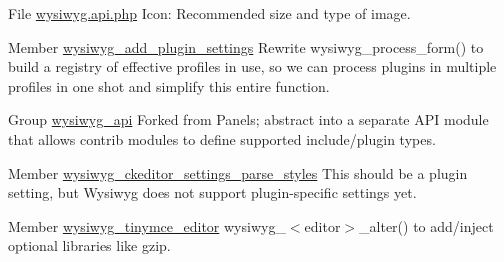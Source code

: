 \label{todo__todo000091}
\hypertarget{todo__todo000091}{}
 
\begin{DoxyDescription}
\item[File \hyperlink{wysiwyg_8api_8php}{wysiwyg.api.php} ]Icon: Recommended size and type of image.


\end{DoxyDescription}

\label{todo__todo000093}
\hypertarget{todo__todo000093}{}
 
\begin{DoxyDescription}
\item[Member \hyperlink{wysiwyg_8module_ab2d3844da95500eafb246c12e44593c3}{wysiwyg\_\-add\_\-plugin\_\-settings} ]Rewrite wysiwyg\_\-process\_\-form() to build a registry of effective profiles in use, so we can process plugins in multiple profiles in one shot and simplify this entire function. 
\end{DoxyDescription}

\label{todo__todo000094}
\hypertarget{todo__todo000094}{}
 
\begin{DoxyDescription}
\item[Group \hyperlink{group__wysiwyg__api}{wysiwyg\_\-api} ]Forked from Panels; abstract into a separate API module that allows contrib modules to define supported include/plugin types. 
\end{DoxyDescription}

\label{todo__todo000089}
\hypertarget{todo__todo000089}{}
 
\begin{DoxyDescription}
\item[Member \hyperlink{ckeditor_8inc_a333ec4086966407d90ad5ab846f44f94}{wysiwyg\_\-ckeditor\_\-settings\_\-parse\_\-styles} ]This should be a plugin setting, but Wysiwyg does not support plugin-\/specific settings yet. 
\end{DoxyDescription}

\label{todo__todo000090}
\hypertarget{todo__todo000090}{}
 
\begin{DoxyDescription}
\item[Member \hyperlink{tinymce_8inc_a20ecffb8ac4c4df58bf2bcbada9dac13}{wysiwyg\_\-tinymce\_\-editor} ]wysiwyg\_\-$<$editor$>$\_\-alter() to add/inject optional libraries like gzip. 
\end{DoxyDescription}